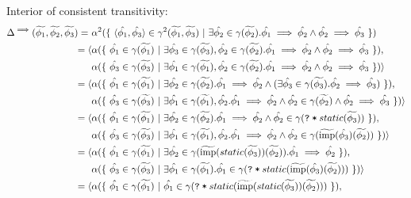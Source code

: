 \documentclass[11pt,a4paper]{article}
\newcommand{\grad}[1]{\widetilde{#1}}
\newcommand{\ttt}{\texttt}
\newcommand{\qm}{\ttt{?}}
\newcommand{\withqm}[1]{\ttt{\qm\:*\:$#1$}}
\newcommand{\imp}{\textrm{imp}}
\begin{document}
Interior of consistent transitivity:
\begin{align*}
\Delta^{\implies}(\grad{\phi_1}, \grad{\phi_2}, \grad{\phi_3})
=~&\alpha^2(\{~ \langle \hat{\phi_1}, \hat{\phi_3} \rangle \in \gamma^2(\grad{\phi_1}, \grad{\phi_3}) ~|~ \exists \hat{\phi_2} \in \gamma(\grad{\phi_2}). \hat{\phi_1} \implies \hat{\phi_2} \wedge \hat{\phi_2} \implies \hat{\phi_3} ~\}) \\
= \langle 
&\alpha(\{~ \hat{\phi_1} \in \gamma(\grad{\phi_1}) ~|~ \exists \hat{\phi_3} \in \gamma(\grad{\phi_3}), \hat{\phi_2} \in \gamma(\grad{\phi_2}). \hat{\phi_1} \implies \hat{\phi_2} \wedge \hat{\phi_2} \implies \hat{\phi_3} ~\}),\\
&\alpha(\{~ \hat{\phi_3} \in \gamma(\grad{\phi_3}) ~|~ \exists \hat{\phi_1} \in \gamma(\grad{\phi_1}), \hat{\phi_2} \in \gamma(\grad{\phi_2}). \hat{\phi_1} \implies \hat{\phi_2} \wedge \hat{\phi_2} \implies \hat{\phi_3} ~\})
\rangle\\
= \langle 
&\alpha(\{~ \hat{\phi_1} \in \gamma(\grad{\phi_1}) ~|~ \exists \hat{\phi_2} \in \gamma(\grad{\phi_2}). \hat{\phi_1} \implies \hat{\phi_2} \wedge (\exists \hat{\phi_3} \in \gamma(\grad{\phi_3}). \hat{\phi_2} \implies \hat{\phi_3}) ~\}),\\
&\alpha(\{~ \hat{\phi_3} \in \gamma(\grad{\phi_3}) ~|~ \exists \hat{\phi_1} \in \gamma(\grad{\phi_1}), \hat{\phi_2}. \hat{\phi_1} \implies \hat{\phi_2} \wedge \hat{\phi_2} \in \gamma(\grad{\phi_2}) \wedge \hat{\phi_2} \implies \hat{\phi_3} ~\})
\rangle\\
= \langle 
&\alpha(\{~ \hat{\phi_1} \in \gamma(\grad{\phi_1}) ~|~ \exists \hat{\phi_2} \in \gamma(\grad{\phi_2}). \hat{\phi_1} \implies \hat{\phi_2} \wedge \hat{\phi_2} \in \gamma(\withqm{static(\grad{\phi_3})}) ~\}),\\
&\alpha(\{~ \hat{\phi_3} \in \gamma(\grad{\phi_3}) ~|~ \exists \hat{\phi_1} \in \gamma(\grad{\phi_1}), \hat{\phi_2}. \hat{\phi_1} \implies \hat{\phi_2} \wedge \hat{\phi_2} \in \gamma(\grad{\imp}(\hat{\phi_3})(\grad{\phi_2})) ~\})
\rangle\\
= \langle 
&\alpha(\{~ \hat{\phi_1} \in \gamma(\grad{\phi_1}) ~|~ \exists \hat{\phi_2} \in \gamma(\grad{\imp}(static(\grad{\phi_3}))(\grad{\phi_2})). \hat{\phi_1} \implies \hat{\phi_2} ~\}),\\
&\alpha(\{~ \hat{\phi_3} \in \gamma(\grad{\phi_3}) ~|~ \exists \hat{\phi_1} \in \gamma(\grad{\phi_1}). \hat{\phi_1} \in \gamma(\withqm{static(\grad{\imp}(\hat{\phi_3})(\grad{\phi_2}))}) ~\})
\rangle\\
= \langle 
&\alpha(\{~ \hat{\phi_1} \in \gamma(\grad{\phi_1}) ~|~ \hat{\phi_1} \in \gamma(\withqm{static(\grad{\imp}(static(\grad{\phi_3}))(\grad{\phi_2}))}) ~\}),\\

\end{align*}
\end{document}
